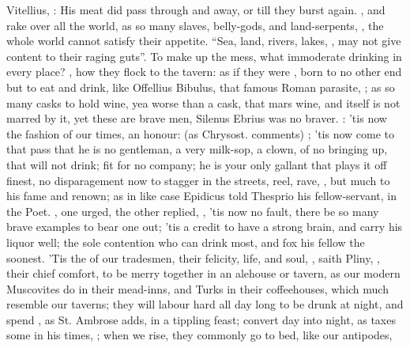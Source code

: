 Vitellius, : His meat did pass
through and away, or till they burst again. , and rake over all the world, as so many
slaves, belly-gods, and land-serpents, , the whole world cannot satisfy their appetite.
\enquote{Sea, land, rivers, lakes, \etc{}, may not give content to
their raging guts}. To make up the mess, what immoderate drinking in every
place? , how they flock to the tavern: as if
they were , born to no other end but to eat and
drink, like Offellius Bibulus, that famous Roman parasite, ; as so many casks to hold wine, yea worse than a cask,
that mars wine, and itself is not marred by it, yet these are brave men,
Silenus Ebrius was no braver. : 'tis now
the fashion of our times, an honour:  (as
Chrysost.  comments) ; 'tis now come
to that pass that he is no gentleman, a very milk-sop, a clown, of no bringing
up, that will not drink; fit for no company; he is your only gallant that plays
it off finest, no disparagement now to stagger in the streets, reel, rave,
\etc{}, but much to his fame and renown; as in like case Epidicus told Thesprio
his fellow-servant, in the Poet. , one urged, the other replied, , 'tis now no fault, there be so many brave examples to bear
one out; 'tis a credit to have a strong brain, and carry his liquor well; the
sole contention who can drink most, and fox his fellow the soonest. 'Tis the
 of our tradesmen, their felicity, life, and soul, , saith Pliny, 
, their chief comfort, to
be merry together in an alehouse or tavern, as our modern Muscovites do in
their mead-inns, and Turks in their coffeehouses, which much resemble our
taverns; they will labour hard all day long to be drunk at night, and spend
, as St. Ambrose adds, in a tippling feast; convert day
into night, as \Seneca{} taxes some in his times, ; when we rise, they commonly go to bed, like our antipodes,

